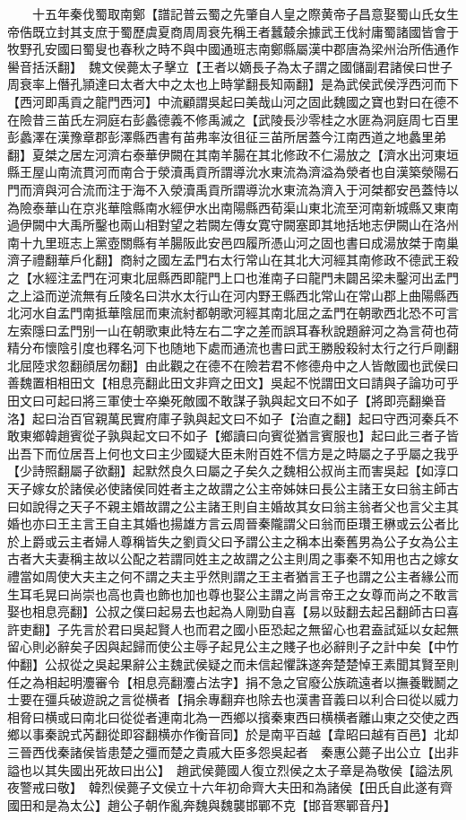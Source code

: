 　　十五年秦伐蜀取南鄭【譜記普云蜀之先肇自人皇之際黄帝子昌意娶蜀山氏女生帝俈既立封其支庶于蜀歷虞夏商周周衰先稱王者蠶樷余據武王伐紂庸蜀諸國皆會于牧野孔安國曰蜀叟也春秋之時不與中國通班志南鄭縣屬漢中郡唐為梁州治所俈通作嚳音括沃翻】　魏文侯薨太子擊立【王者以嫡長子為太子謂之國儲副君諸侯曰世子周衰率上僭孔頴達曰太者大中之太也上時掌翻長知兩翻】是為武侯武侯浮西河而下【西河即禹貢之龍門西河】中流顧謂吳起曰美哉山河之固此魏國之寶也對曰在德不在險昔三苖氏左洞庭右彭蠡德義不修禹滅之【武陵長沙零桂之水匪為洞庭周七百里彭蠡澤在漢豫章郡彭澤縣西書有苖弗率汝徂征三苖所居蓋今江南西道之地蠡里弟翻】夏桀之居左河濟右泰華伊闕在其南羊腸在其北修政不仁湯放之【濟水出河東垣縣王屋山南流貫河而南合于滎瀆禹貢所謂導沇水東流為濟溢為滎者也自漢築滎陽石門而濟與河合流而注于海不入滎瀆禹貢所謂導沇水東流為濟入于河桀都安邑蓋恃以為險泰華山在京兆華陰縣南水經伊水出南陽縣西荀渠山東北流至河南新城縣又東南過伊闕中大禹所鑿也兩山相對望之若闕左傳女寛守闕塞即其地括地志伊闕山在洛州南十九里班志上黨壺關縣有羊腸阪此安邑四履所憑山河之固也書曰成湯放桀于南巢濟子禮翻華戶化翻】商紂之國左孟門右太行常山在其北大河經其南修政不德武王殺之【水經注孟門在河東北屈縣西即龍門上口也淮南子曰龍門未闢呂梁未鑿河出孟門之上溢而逆流無有丘陵名曰洪水太行山在河内野王縣西北常山在常山郡上曲陽縣西北河水自孟門南抵華陰屈而東流紂都朝歌河經其南北屈之孟門在朝歌西北恐不可言左索隱曰孟門别一山在朝歌東此特左右二字之差而誤耳春秋說題辭河之為言荷也荷精分布懷陰引度也釋名河下也随地下處而通流也書曰武王勝殷殺紂太行之行戶剛翻北屈陸求忽翻顔居勿翻】由此觀之在德不在險若君不修德舟中之人皆敵國也武侯曰善魏置相相田文【相息亮翻此田文非齊之田文】吳起不悦謂田文曰請與子論功可乎田文曰可起曰將三軍使士卒樂死敵國不敢謀子孰與起文曰不如子【將即亮翻樂音洛】起曰治百官親萬民實府庫子孰與起文曰不如子【治直之翻】起曰守西河秦兵不敢東鄉韓趙賓從子孰與起文曰不如子【鄉讀曰向賓從猶言賓服也】起曰此三者子皆出吾下而位居吾上何也文曰主少國疑大臣未附百姓不信方是之時屬之子乎屬之我乎【少詩照翻屬子欲翻】起默然良久曰屬之子矣久之魏相公叔尚主而害吳起【如淳口天子嫁女於諸侯必使諸侯同姓者主之故謂之公主帝姊妹曰長公主諸王女曰翁主師古曰如說得之天子不親主㛰故謂之公主諸王則自主婚故其女曰翁主翁者父也言父主其婚也亦曰王主言王自主其婚也揚雄方言云周晉秦隴謂父曰翁而臣瓚王楙或云公者比於上爵或云主者婦人尊稱皆失之劉貢父曰予謂公主之稱本出秦舊男為公子女為公主古者大夫妻稱主故以公配之若謂同姓主之故謂之公主則周之事秦不知用也古之嫁女禮當如周使大夫主之何不謂之夫主乎然則謂之王主者猶言王子也謂之公主者緣公而生耳毛晃曰尚崇也高也貴也飾也加也尊也娶公主謂之尚言帝王之女尊而尚之不敢言娶也相息亮翻】公叔之僕曰起易去也起為人剛勁自喜【易以䜴翻去起呂翻師古曰喜許吏翻】子先言於君曰吳起賢人也而君之國小臣恐起之無留心也君盍試延以女起無留心則必辭矣子因與起歸而使公主辱子起見公主之賤子也必辭則子之計中矣【中竹仲翻】公叔從之吳起果辭公主魏武侯疑之而未信起懼誅遂奔楚楚悼王素聞其賢至則任之為相起明灋審令【相息亮翻灋占法字】捐不急之官廢公族疏遠者以撫養戰鬭之士要在彊兵破遊說之言從横者【捐余專翻弃也除去也漢書音義曰以利合曰從以威力相脅曰横或曰南北曰從從者連南北為一西鄉以擯秦東西曰横横者離山東之交使之西鄉以事秦說式芮翻從即容翻横亦作衡音同】於是南平百越【韋昭曰越有百邑】北却三晉西伐秦諸侯皆患楚之彊而楚之貴戚大臣多怨吳起者　秦惠公薨子出公立【出非謚也以其失國出死故曰出公】　趙武侯薨國人復立烈侯之太子章是為敬侯【謚法夙夜警戒曰敬】　韓烈侯薨子文侯立十六年初命齊大夫田和為諸侯【田氏自此遂有齊國田和是為太公】趙公子朝作亂奔魏與魏襲邯鄲不克【邯音寒鄲音丹】

